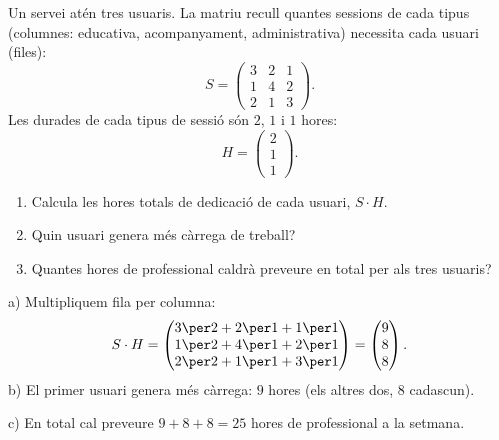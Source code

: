 \begin{exresolt}
Un servei atén tres usuaris. La matriu recull quantes sessions de cada tipus
(columnes: educativa, acompanyament, administrativa) necessita cada usuari (files):
\[
S=\begin{pmatrix} 3 & 2 & 1 \\ 1 & 4 & 2 \\ 2 & 1 & 3 \end{pmatrix}.
\]
Les durades de cada tipus de sessió són $2$, $1$ i $1$ hores:
\[
H=\begin{pmatrix} 2 \\ 1 \\ 1 \end{pmatrix}.
\]
\begin{enumerate}[label=\alph*), leftmargin=1.6em, topsep=2pt]
  \item Calcula les hores totals de dedicació de cada usuari, $S\cdot H$.
  \item Quin usuari genera més càrrega de treball?
  \item Quantes hores de professional caldrà preveure en total per als tres usuaris?
\end{enumerate}
\solucio
a) Multipliquem fila per columna:
\[
S\cdot H=\begin{pmatrix} 3\per 2+2\per 1+1\per 1 \\ 1\per 2+4\per 1+2\per 1 \\ 2\per 2+1\per 1+3\per 1 \end{pmatrix}
        =\begin{pmatrix} 9 \\ 8 \\ 8 \end{pmatrix}.
\]
b) El primer usuari genera més càrrega: $9$ hores (els altres dos, $8$ cadascun).

c) En total cal preveure $9 + 8 + 8 = 25$ hores de professional a la setmana.
\end{exresolt}

